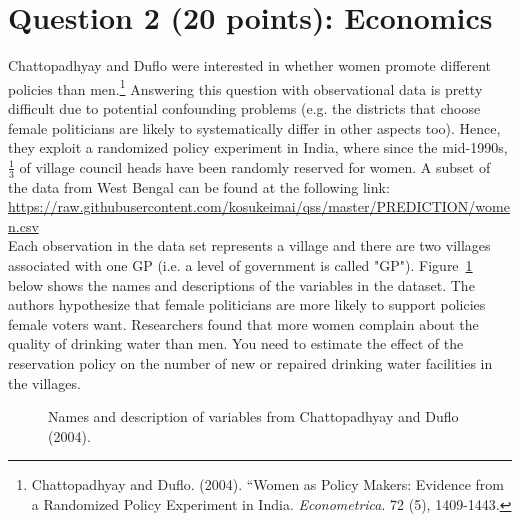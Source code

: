\documentclass[12pt,letterpaper]{article}
\begin{document}
	\section*{Question 2 (20 points): Economics}
	Chattopadhyay and Duflo were interested in whether women promote different policies than men.\footnote{Chattopadhyay and Duflo. (2004). ``Women as Policy Makers: Evidence from a Randomized Policy Experiment in India. \textit{Econometrica}. 72 (5), 1409-1443.} Answering this question with observational data is pretty difficult due to potential confounding problems (e.g. the districts that choose female politicians are likely to systematically differ in other aspects too). Hence, they exploit a randomized policy experiment in India, where since the mid-1990s, $\frac{1}{3}$ of village council heads have been randomly reserved for women. A subset of the data from West Bengal can be found at the following link: \url{https://raw.githubusercontent.com/kosukeimai/qss/master/PREDICTION/women.csv}\\
	
	\noindent Each observation in the data set represents a village and there are two villages associated with one GP (i.e. a level of government is called "GP"). Figure~\ref{fig:women_desc} below shows the names and descriptions of the variables in the dataset. The authors hypothesize that female politicians are more likely to support policies female voters want. Researchers found that more women complain about the quality of drinking water than men. You need to estimate the effect of the reservation policy on the number of new or repaired drinking water facilities in the villages.
	\vspace{.5cm}
	\begin{figure}[h!]
		\caption{\footnotesize{Names and description of variables from Chattopadhyay and Duflo (2004).}}
		\vspace{.5cm}
		\centering
		\label{fig:women_desc}
	\end{figure}		
	
\end{document}
